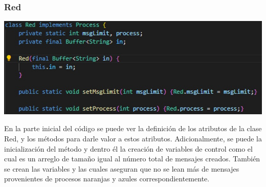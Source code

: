 \documentclass[a4paper]{article}
\begin{document}
    \subsubsection{Red}
    \begin{center}
        \includegraphics[scale=0.5]{R0.jpeg}    
    \end{center}
    En la parte inicial del c\'odigo se puede ver la definici\'on de los atributos de la clase Red, y los m\'etodos para darle valor a estos atributos.
    Adicionalmente, se puede la inicializaci\'on del m\'etodo  y dentro \'el la creaci\'on de variables de control como  el cual es un arreglo de tama\~no igual al n\'umero total de mensajes creados.
    Tambi\'en se crean las variables  y  las cuales aseguran que no se lean m\'as de  mensajes provenientes de procesos naranjas y azules correspondientemente.\\
\end{document}
